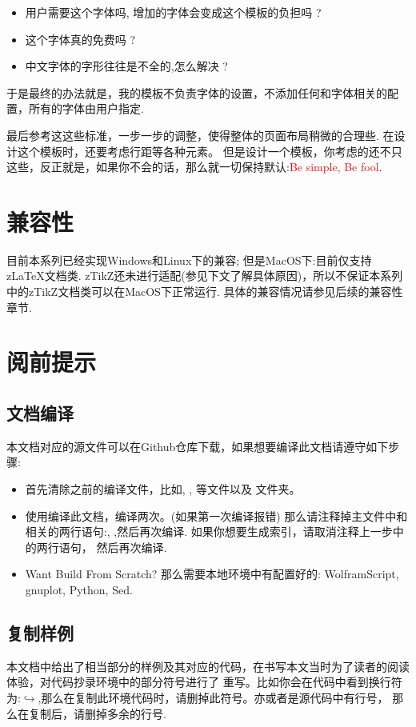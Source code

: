 \begin{itemize}
    \item 用户需要这个字体吗, 增加的字体会变成这个模板的负担吗 ?
    \item 这个字体真的免费吗 ?
    \item 中文字体的字形往往是不全的,怎么解决 ? 
\end{itemize}

于是最终的办法就是，我的模板不负责字体的设置，不添加任何和字体相关的配置，所有的字体由用户指定. 


最后参考这这些标准，一步一步的调整，使得整体的页面布局稍微的合理些. 在设计这个模板时，还要考虑行距等各种元素。
但是设计一个模板，你考虑的还不只这些，反正就是，如果你不会的话，那么就一切保持默认:\textcolor{red}{Be simple, Be fool}.

\section{兼容性}
目前本系列已经实现Windows和Linux下的兼容; 但是MacOS下:目前仅支持z\LaTeX{}文档类.
zTikZ还未进行适配(参见下文了解具体原因)，所以不保证本系列中的zTikZ文档类可以在MacOS下正常运行.
具体的兼容情况请参见后续的兼容性章节.


\section{阅前提示}
\subsection{文档编译}
本文档对应的源文件可以在Github仓库下载，如果想要编译此文档请遵守如下步骤:
\begin{itemize}
    \item 首先清除之前的编译文件，比如, , 等文件以及
        文件夹。
    \item 使用编译此文档，编译两次。(如果第一次编译报错)
        那么请注释掉主文件中和相关的两行语句:\cmd{\makeindex[]{}},
        \cmd{\printindex[]{}},然后再次编译. 如果你想要生成索引，请取消注释上一步中的两行语句，
        然后再次编译.
    \item Want Build From Scratch? 那么需要本地环境中有配置好的: WolframScript, gnuplot, Python, Sed.
\end{itemize}

\subsection{复制样例}
本文档中给出了相当部分的样例及其对应的代码，在书写本文当时为了读者的阅读体验，对代码抄录环境中的部分符号进行了
重写。比如你会在代码中看到换行符为:$\hookrightarrow$,那么在复制此环境代码时，请删掉此符号。亦或者是源代码中有行号，
那么在复制后，请删掉多余的行号.

